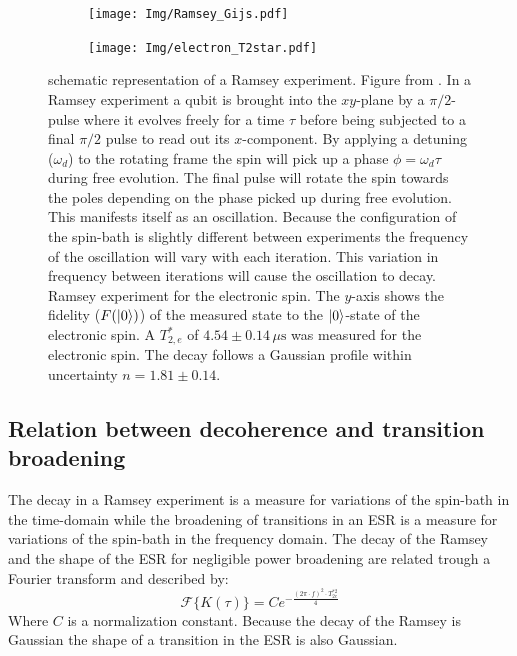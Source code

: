 \begin{figure}[htbp]
    \centering
    \begin{subfigure}[t]{0.49\textwidth}\centering
        \caption{}
        \texttt{[image: Img/Ramsey\_Gijs.pdf]}
        \label{fig:Ramsey_gijs}
    \end{subfigure}
    \begin{subfigure}[t]{0.49\textwidth}\centering
        \caption{}
        \texttt{[image: Img/electron\_T2star.pdf]}
        \label{fig:electron_T2*}
    \end{subfigure}
        \caption{
        \textbf{} schematic representation of a Ramsey experiment. Figure from \citet{Lange2012Quantum}.
        In a Ramsey experiment a qubit is brought into the $xy$-plane by a $\pi/2$-pulse where it evolves freely for a time $\tau$ before being subjected to a final $\pi/2$ pulse to read out its $x$-component.
        By applying a detuning ($\omega_d$) to the rotating frame the spin will pick up a phase $\phi = \omega_d \tau$ during free evolution.
        The final pulse will rotate the spin towards the poles depending on the phase picked up during free evolution.
        This manifests itself as an oscillation.
        Because the configuration of the spin-bath is slightly different between experiments the frequency of the oscillation will vary with each iteration.
        This variation in frequency between iterations will cause the oscillation to decay.
         Ramsey experiment for the electronic spin.
        The $y$-axis shows the fidelity ($F({\left\vert{0}\right\rangle})$) of the measured state to the ${\left\vert{0}\right\rangle}$-state of the electronic spin.
        A $T_{2,e}^*$ of $4.54 \pm 0.14\, \mu\mathrm{s}$ was measured for the electronic spin. The decay follows a Gaussian profile within uncertainty $n = 1.81 \pm 0.14$. }
\end{figure}


\subsection{Relation between decoherence and transition broadening}
The decay in a Ramsey experiment is a measure for variations of the spin-bath in the time-domain while the broadening of transitions in an ESR is a measure for variations of the spin-bath in the frequency domain.
The decay of the Ramsey and the shape of the ESR for negligible power broadening are related trough a Fourier transform and described by:
\begin{equation}
    \mathcal{F} \{ K(\tau) \} =  C e^{-\tfrac{(2\pi \cdot f) ^2 \cdot T_{2e}^{*2}}{ 4}}
    \label{eq:ESR_dip_shape}
\end{equation}
Where $C$ is a normalization constant.
Because the decay of the Ramsey is Gaussian the shape of a transition in the ESR is also Gaussian.

